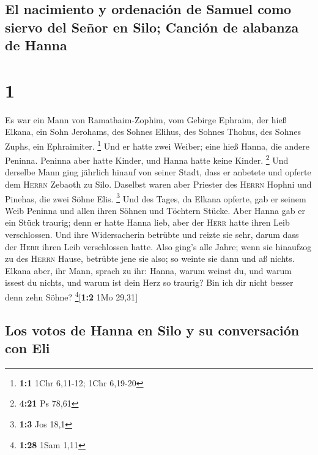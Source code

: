 \hypertarget{el-nacimiento-y-ordenaciuxf3n-de-samuel-como-siervo-del-seuxf1or-en-silo-canciuxf3n-de-alabanza-de-hanna}{%
\subsection{El nacimiento y ordenación de Samuel como siervo del Señor
en Silo; Canción de alabanza de
Hanna}\label{el-nacimiento-y-ordenaciuxf3n-de-samuel-como-siervo-del-seuxf1or-en-silo-canciuxf3n-de-alabanza-de-hanna}}

\hypertarget{section}{%
\section{1}\label{section}}

 Es war ein Mann von Ramathaim-Zophim, vom Gebirge
Ephraim, der hieß Elkana, ein Sohn Jerohams, des Sohnes Elihus, des
Sohnes Thohus, des Sohnes Zuphs, ein Ephraimiter. \footnote{\textbf{1:1}
  1Chr 6,11-12; 1Chr 6,19-20}  Und er hatte zwei Weiber;
eine hieß Hanna, die andere Peninna. Peninna aber hatte Kinder, und
Hanna hatte keine Kinder. \footnote{\textbf{4:21} Ps 78,61}
 Und derselbe Mann ging jährlich hinauf von seiner Stadt,
dass er anbetete und opferte dem \textsc{Herrn} Zebaoth zu Silo.
Daselbst waren aber Priester des \textsc{Herrn} Hophni und Pinehas, die
zwei Söhne Elis. \footnote{\textbf{1:3} Jos 18,1}  Und des
Tages, da Elkana opferte, gab er seinem Weib Peninna und allen ihren
Söhnen und Töchtern Stücke.  Aber Hanna gab er ein Stück
traurig; denn er hatte Hanna lieb, aber der \textsc{Herr} hatte ihren
Leib verschlossen.  Und ihre Widersacherin betrübte und
reizte sie sehr, darum dass der \textsc{Herr} ihren Leib verschlossen
hatte.  Also ging's alle Jahre; wenn sie hinaufzog zu des
\textsc{Herrn} Hause, betrübte jene sie also; so weinte sie dann und aß
nichts.  Elkana aber, ihr Mann, sprach zu ihr: Hanna,
warum weinst du, und warum issest du nichts, und warum ist dein Herz so
traurig? Bin ich dir nicht besser denn zehn Söhne?
\footnote{\textbf{1:28} 1Sam 1,11}{[}\textbf{1:2} 1Mo 29,31{]}

\hypertarget{los-votos-de-hanna-en-silo-y-su-conversaciuxf3n-con-eli}{%
\subsection{Los votos de Hanna en Silo y su conversación con
Eli}\label{los-votos-de-hanna-en-silo-y-su-conversaciuxf3n-con-eli}}

